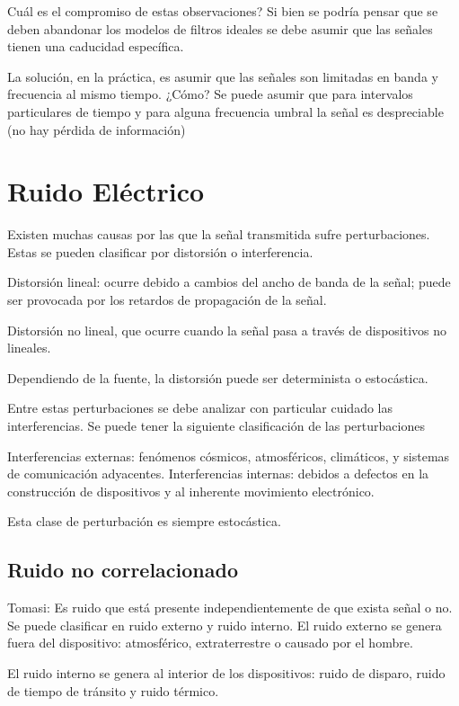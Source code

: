 \documentclass[12pt,letterpaper,titlepage,twoside]{book}
\begin{document}
Cuál es el compromiso de estas observaciones? Si bien se podría pensar que se deben abandonar los modelos de filtros ideales se debe asumir que las señales tienen una caducidad específica.

La solución, en la práctica, es asumir que las señales son limitadas en banda y frecuencia al mismo tiempo. ¿Cómo? Se puede asumir que para intervalos particulares de tiempo  y para alguna frecuencia umbral la señal es despreciable (no hay pérdida de información)

\section{Ruido Eléctrico}

Existen muchas causas por las que la señal transmitida sufre perturbaciones. Estas se pueden clasificar por distorsión o interferencia.

Distorsión lineal: ocurre debido a cambios del ancho de banda de la señal; puede ser provocada por los retardos de propagación de la señal.

Distorsión no lineal, que ocurre cuando la señal pasa a través de dispositivos no lineales.

Dependiendo de la fuente, la distorsión puede ser determinista o estocástica.

Entre estas perturbaciones se debe analizar con particular cuidado las interferencias.
Se puede tener la siguiente clasificación de las perturbaciones

Interferencias externas: fenómenos cósmicos, atmosféricos, climáticos, y sistemas de comunicación adyacentes.
Interferencias internas: debidos a defectos en la construcción de dispositivos y al inherente movimiento electrónico.

Esta clase de perturbación es siempre estocástica.



\subsection{Ruido no correlacionado}
Tomasi: Es ruido que está presente independientemente de que exista señal o no. Se puede clasificar en ruido externo y ruido interno.
El ruido externo se genera fuera del dispositivo: atmosférico, extraterrestre o causado por el hombre.

El ruido interno se genera al interior de los dispositivos: ruido de disparo, ruido de tiempo de tránsito y ruido térmico.
\end{document}
